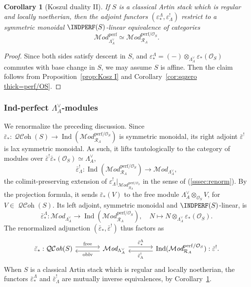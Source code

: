 \documentclass[12pt, oneside]{amsart}
\numberwithin{equation}{section}
\newtheorem{corollary}[subsubsection]{Corollary}
\theoremstyle{remark}
\theoremstyle{plain}
\newcommand{\MOD}{\mathcal{M}\textit{od}}
\DeclareMathOperator{\QCOH}{\mathcal{QC}\textit{oh}}
\newcommand{\R}{\mathcal{R}}
\newcommand{\RA}{\R_A}
\newcommand{\lamco}{\Lambda^\vee}
\newcommand{\OO}{\mathcal{O}}
\newcommand{\Ind}{\operatorname{Ind}}
\newcommand{\eps}{\varepsilon}
\newcommand{\epsb}{\bar{\varepsilon}}
\begin{document}
\begin{corollary}[Koszul duality II]\label{cor:Kosz II}
If $S$ is a classical Artin stack which is regular and locally noetherian, then the adjoint functors $(\eps_*^{\Lambda}, \eps^!_{\Lambda})$ restrict to a symmetric monoidal $\INDPERF(S)$-linear equivalence of categories
\[ \MOD_{\lamco_A}^{\mathrm{perf}} \simeq \MOD_{\RA}^{\mathrm{perf}/\OO_S}. \]
\end{corollary}
\begin{proof}
Since both sides satisfy descent in $S$, and $\eps_*^{\Lambda} = (-)\otimes_{\lamco_A}\eps_*(\OO_S)$ commutes with base change in $S$, we may assume $S$ is affine.
Then the claim follows from Proposition~\ref{prop:Kosz I} and Corollary~\ref{cor:sqzero thick=perf/OS}.
\end{proof}

\subsubsection{Ind-perfect \texorpdfstring{$\lamco_A$}{Lambda_A}-modules}\label{sssec:indperf Lambda modules}

We renormalize the preceding discussion.
Since $\epsb_* : \QCOH(S) \to \Ind(\MOD_{\RA}^{\mathrm{perf}/\OO_S})$ is symmetric monoidal, its right adjoint $\epsb^!$ is lax symmetric monoidal.
As such, it lifts tautologically to the category of modules over $\epsb^!\epsb_*(\OO_S) \simeq \lamco_A$,
\[
  \epsb^!_{\Lambda} : \Ind(\MOD_{\RA}^{\mathrm{perf}/\OO_S}) \to \MOD_{\lamco_A},
\]
the colimit-preserving extension of $\eps^!_{\Lambda}|_{\MOD_{\RA}^{\mathrm{perf}/\OO_S}}$ in the sense of (\ref{sssec:renorm}).
By the projection formula, it sends $\epsb_*(V)$ to the free module $\lamco_A \otimes_{\OO_S} V$, for $V \in \QCOH(S)$.
Its left adjoint, symmetric monoidal and $\INDPERF(S)$-linear, is
\[
  \epsb_*^{\Lambda} : \MOD_{\lamco_A} \to \Ind(\MOD_{\RA}^{\mathrm{perf}/\OO_S}),
  \quad N \mapsto N \otimes_{\lamco_A} \eps_*(\OO_S).
\]
The renormalized adjunction $(\epsb_*, \epsb^!)$ thus factors as
\[\begin{tikzcd}[column sep=large]
  \epsb_*: \QCOH(S)
  \arrow[r, shift left=3pt, "\mathrm{free}"]
  &
  \MOD_{\lamco_A}
  \arrow[l, shift left=3pt, "\mathrm{oblv}"]
  \arrow[r, shift left=3pt, "\epsb_*^{\Lambda}"]
  &
  \Ind(\MOD_{\RA}^{\mathrm{perf}/\OO_S}) : \epsb^!.
  \arrow[l, shift left=3pt, "\epsb^!_{\Lambda}"]
\end{tikzcd}\]
When $S$ is a classical Artin stack which is regular and locally noetherian, the functors $\epsb_*^{\Lambda}$ and $\epsb^!_{\Lambda}$ are mutually inverse equivalences, by Corollary~\ref{cor:Kosz II}.
\end{document}
